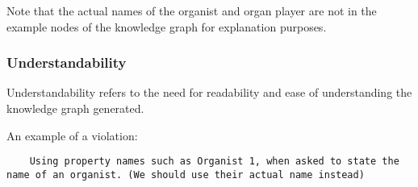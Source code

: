 Note that the actual names of the organist and organ player are not in the example nodes of the knowledge graph for explanation purposes. 

\subsubsection{Understandability}
\hspace{0.5cm} Understandability refers to the need for readability and ease of understanding the knowledge graph generated. \cite{knowledgegraphevaulationbook}

An example of a violation: 
\begin{lstlisting}
    Using property names such as Organist 1, when asked to state the name of an organist. (We should use their actual name instead)
\end{lstlisting}
\begin{center}
\end{center}

